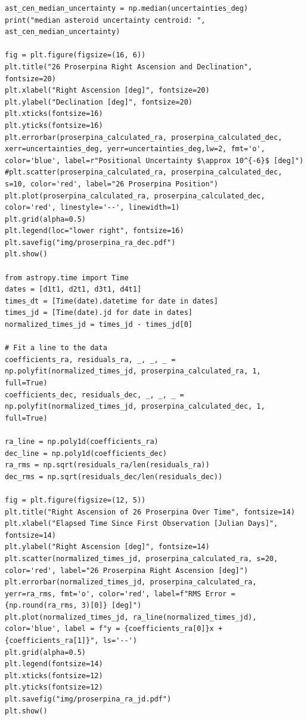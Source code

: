 \documentclass{article}
\begin{document}
\begin{appendices}
\begin{small}
\begin{verbatim}
ast_cen_median_uncertainty = np.median(uncertainties_deg)
print("median asteroid uncertainty centroid: ", ast_cen_median_uncertainty)

fig = plt.figure(figsize=(16, 6))
plt.title("26 Proserpina Right Ascension and Declination", fontsize=20)
plt.xlabel("Right Ascension [deg]", fontsize=20)
plt.ylabel("Declination [deg]", fontsize=20)
plt.xticks(fontsize=16)
plt.yticks(fontsize=16)
plt.errorbar(proserpina_calculated_ra, proserpina_calculated_dec, xerr=uncertainties_deg, yerr=uncertainties_deg,lw=2, fmt='o', color='blue', label=r"Positional Uncertainty $\approx 10^{-6}$ [deg]")
#plt.scatter(proserpina_calculated_ra, proserpina_calculated_dec, s=10, color='red', label="26 Proserpina Position")
plt.plot(proserpina_calculated_ra, proserpina_calculated_dec, color='red', linestyle='--', linewidth=1)
plt.grid(alpha=0.5)
plt.legend(loc="lower right", fontsize=16)
plt.savefig("img/proserpina_ra_dec.pdf")
plt.show()

from astropy.time import Time
dates = [d1t1, d2t1, d3t1, d4t1]
times_dt = [Time(date).datetime for date in dates]
times_jd = [Time(date).jd for date in dates]
normalized_times_jd = times_jd - times_jd[0]

# Fit a line to the data 
coefficients_ra, residuals_ra, _, _, _ = np.polyfit(normalized_times_jd, proserpina_calculated_ra, 1, full=True)
coefficients_dec, residuals_dec, _, _, _ = np.polyfit(normalized_times_jd, proserpina_calculated_dec, 1, full=True)

ra_line = np.poly1d(coefficients_ra)
dec_line = np.poly1d(coefficients_dec)
ra_rms = np.sqrt(residuals_ra/len(residuals_ra))
dec_rms = np.sqrt(residuals_dec/len(residuals_dec))

fig = plt.figure(figsize=(12, 5))
plt.title("Right Ascension of 26 Proserpina Over Time", fontsize=14)
plt.xlabel("Elapsed Time Since First Observation [Julian Days]", fontsize=14)
plt.ylabel("Right Ascension [deg]", fontsize=14)
plt.scatter(normalized_times_jd, proserpina_calculated_ra, s=20, color='red', label="26 Proserpina Right Ascension [deg]")
plt.errorbar(normalized_times_jd, proserpina_calculated_ra, yerr=ra_rms, fmt='o', color='red', label=f"RMS Error = {np.round(ra_rms, 3)[0]} [deg]")
plt.plot(normalized_times_jd, ra_line(normalized_times_jd), color='blue', label = f"y = {coefficients_ra[0]}x + {coefficients_ra[1]}", ls='--')
plt.grid(alpha=0.5)
plt.legend(fontsize=14)
plt.xticks(fontsize=12)
plt.yticks(fontsize=12)
plt.savefig("img/proserpina_ra_jd.pdf")
plt.show()


\end{verbatim}
\end{small}
\end{appendices}
\end{document}
